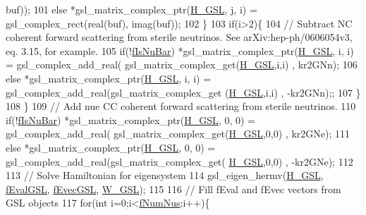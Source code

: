 \begin{DoxyCode}
      buf));
101       \textcolor{keywordflow}{else}          *gsl\_matrix\_complex\_ptr(\hyperlink{classOscProb_1_1PMNS__Sterile_aeff790051925a3135b7529ced67e81ab}{H\_GSL}, j, i) = gsl\_complex\_rect(real(buf), imag(buf));
102     \}
103     \textcolor{keywordflow}{if}(i>2)\{
104       \textcolor{comment}{// Subtract NC coherent forward scattering from sterile neutrinos. See arXiv:hep-ph/0606054v3, eq.
       3.15, for example. }
105       \textcolor{keywordflow}{if}(!\hyperlink{classOscProb_1_1PMNS__Base_a0ebaeaefab36a3ff381c6293faedfdd6}{fIsNuBar}) *gsl\_matrix\_complex\_ptr(\hyperlink{classOscProb_1_1PMNS__Sterile_aeff790051925a3135b7529ced67e81ab}{H\_GSL}, i, i) = gsl\_complex\_add\_real(
      gsl\_matrix\_complex\_get(\hyperlink{classOscProb_1_1PMNS__Sterile_aeff790051925a3135b7529ced67e81ab}{H\_GSL},i,i) ,  kr2GNn);
106       \textcolor{keywordflow}{else}          *gsl\_matrix\_complex\_ptr(\hyperlink{classOscProb_1_1PMNS__Sterile_aeff790051925a3135b7529ced67e81ab}{H\_GSL}, i, i) = gsl\_complex\_add\_real(gsl\_matrix\_complex\_get
      (\hyperlink{classOscProb_1_1PMNS__Sterile_aeff790051925a3135b7529ced67e81ab}{H\_GSL},i,i) , -kr2GNn);;
107     \}
108   \}
109   \textcolor{comment}{// Add nue CC coherent forward scattering from sterile neutrinos. }
110   \textcolor{keywordflow}{if}(!\hyperlink{classOscProb_1_1PMNS__Base_a0ebaeaefab36a3ff381c6293faedfdd6}{fIsNuBar}) *gsl\_matrix\_complex\_ptr(\hyperlink{classOscProb_1_1PMNS__Sterile_aeff790051925a3135b7529ced67e81ab}{H\_GSL}, 0, 0) = gsl\_complex\_add\_real(
      gsl\_matrix\_complex\_get(\hyperlink{classOscProb_1_1PMNS__Sterile_aeff790051925a3135b7529ced67e81ab}{H\_GSL},0,0) ,  kr2GNe);
111   \textcolor{keywordflow}{else}          *gsl\_matrix\_complex\_ptr(\hyperlink{classOscProb_1_1PMNS__Sterile_aeff790051925a3135b7529ced67e81ab}{H\_GSL}, 0, 0) = gsl\_complex\_add\_real(gsl\_matrix\_complex\_get(
      \hyperlink{classOscProb_1_1PMNS__Sterile_aeff790051925a3135b7529ced67e81ab}{H\_GSL},0,0) , -kr2GNe);
112 
113   \textcolor{comment}{// Solve Hamiltonian for eigensystem}
114   gsl\_eigen\_hermv(\hyperlink{classOscProb_1_1PMNS__Sterile_aeff790051925a3135b7529ced67e81ab}{H\_GSL}, \hyperlink{classOscProb_1_1PMNS__Sterile_abdcb0a144aadef0239dfb36ed4ed0297}{fEvalGSL}, \hyperlink{classOscProb_1_1PMNS__Sterile_a8ab71bc7de328eb6ba855904f365fb1d}{fEvecGSL}, \hyperlink{classOscProb_1_1PMNS__Sterile_a4e8aed8fd29297e4833488572c9a4eb1}{W\_GSL});
115 
116   \textcolor{comment}{// Fill fEval and fEvec vectors from GSL objects}
117   \textcolor{keywordflow}{for}(\textcolor{keywordtype}{int} i=0;i<\hyperlink{classOscProb_1_1PMNS__Base_a24bb74bed63569dfe88b18fa6a08060e}{fNumNus};i++)\{

\end{DoxyCode}
